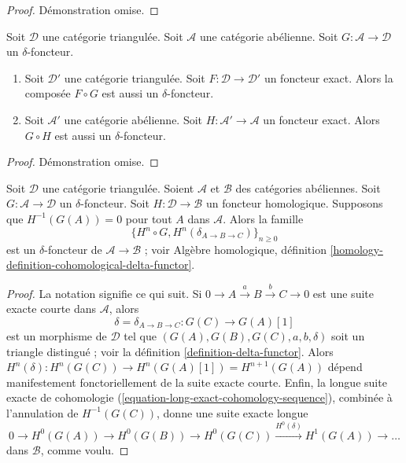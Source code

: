 \begin{proof}
Démonstration omise.
\end{proof}

\begin{lemma}
\label{lemma-exact-compose-delta-functor}
Soit $\mathcal{D}$ une catégorie triangulée.
Soit $\mathcal{A}$ une catégorie abélienne.
Soit $G : \mathcal{A} \to \mathcal{D}$ un $\delta$-foncteur.
\begin{enumerate}
\item Soit $\mathcal{D}'$ une catégorie triangulée.
Soit $F : \mathcal{D} \to \mathcal{D}'$ un foncteur exact.
Alors la composée $F \circ G$ est aussi un $\delta$-foncteur.
\item Soit $\mathcal{A}'$ une catégorie abélienne. Soit
$H : \mathcal{A}' \to \mathcal{A}$ un foncteur exact.
Alors $G \circ H$ est aussi un $\delta$-foncteur.
\end{enumerate}
\end{lemma}

\begin{proof}
Démonstration omise.
\end{proof}

\begin{lemma}
\label{lemma-compose-delta-functor-homological}
Soit $\mathcal{D}$ une catégorie triangulée.
Soient $\mathcal{A}$ et $\mathcal{B}$ des catégories abéliennes.
Soit $G : \mathcal{A} \to \mathcal{D}$ un $\delta$-foncteur.
Soit $H : \mathcal{D} \to \mathcal{B}$ un foncteur homologique.
Supposons que $H^{-1}(G(A)) = 0$ pour tout $A$ dans $\mathcal{A}$.
Alors la famille
$$
\{H^n \circ G, H^n(\delta_{A \to B \to C})\}_{n \geq 0}
$$
est un $\delta$-foncteur de $\mathcal{A} \to \mathcal{B}$ ; voir
Algèbre homologique, définition
\ref{homology-definition-cohomological-delta-functor}.
\end{lemma}

\begin{proof}
La notation signifie ce qui suit. Si
$0 \to A \xrightarrow{a} B \xrightarrow{b} C \to 0$ est une suite exacte
courte dans $\mathcal{A}$, alors
$$
\delta = \delta_{A \to B \to C} : G(C) \to G(A)[1]
$$
est un morphisme de $\mathcal{D}$ tel que
$(G(A), G(B), G(C), a, b, \delta)$ soit un triangle distingué ; voir la
définition \ref{definition-delta-functor}.
Alors $H^n(\delta) : H^n(G(C)) \to H^n(G(A)[1]) = H^{n + 1}(G(A))$ dépend
manifestement fonctoriellement de la suite exacte courte.
Enfin, la longue suite exacte de cohomologie
(\ref{equation-long-exact-cohomology-sequence}), combinée à l'annulation de
$H^{-1}(G(C))$, donne une suite exacte longue
$$
0 \to H^0(G(A)) \to H^0(G(B)) \to H^0(G(C))
\xrightarrow{H^0(\delta)} H^1(G(A)) \to \ldots
$$
dans $\mathcal{B}$, comme voulu.
\end{proof}

